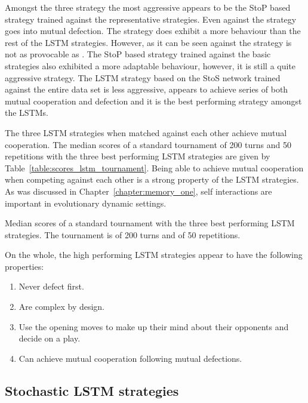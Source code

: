 Amongst the three strategy the most aggressive appears to be the StoP based
strategy trained against the representative strategies. Even against \Adaptive the
strategy goes into mutual defection. The strategy does exhibit a more \Grudger
behaviour than the rest of the LSTM strategies. However, as it can be seen
against \ZDExtortTwo the strategy is not as provocable as \Grudger. The StoP based
strategy trained against the basic strategies also exhibited a more adaptable
behaviour, however, it is still a quite aggressive strategy. The
LSTM strategy based on the StoS network trained against the entire data set is
less aggressive, appears to achieve series of both mutual cooperation and
defection and it is the best performing strategy amongst the LSTMs.

The three LSTM strategies when matched against each other achieve mutual
cooperation. The median scores of a standard tournament of 200 turns and 50
repetitions with the three best performing LSTM strategies are given by
Table~\ref{table:scores_lstm_tournament}. Being able to achieve mutual
cooperation when competing against each other is a strong property of the LSTM
strategies. As was discussed in Chapter~\ref{chapter:memory_one}, self
interactions are important in evolutionary dynamic settings.

\begin{table}[!htbp]
    \begin{center}
    \resizebox{\textwidth}{!}{
        
    }
\end{center}
\caption{Median scores of a standard tournament with the three best performing
LSTM strategies. The tournament is of 200 turns and of 50
repetitions.}\label{table:scores_lstm_tournament}
\end{table}

On the whole, the high performing LSTM strategies appear to have the following
properties:

\begin{enumerate}
    \item Never defect first.
    \item Are complex by design.
    \item Use the opening moves to make up their mind about their opponents and decide on a play.
    \item Can achieve mutual cooperation following mutual defections.
\end{enumerate}

\subsection{Stochastic LSTM strategies}\label{sec:stochastic-lstm-strategies}

